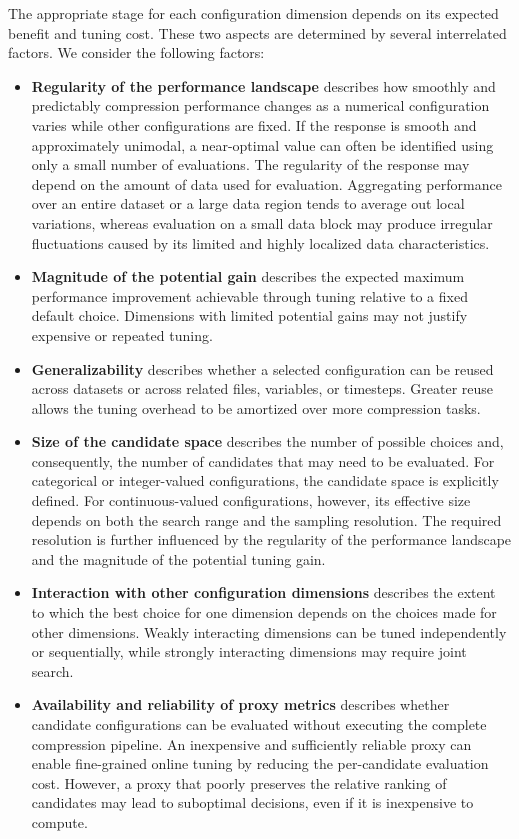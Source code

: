 The appropriate stage for each configuration dimension depends on its expected benefit and tuning cost. These two aspects are determined by several interrelated factors. We consider the following factors:

\begin{itemize}
\item \textbf{Regularity of the performance landscape} describes how smoothly and predictably compression performance changes as a numerical configuration varies while other configurations are fixed. If the response is smooth and approximately unimodal, a near-optimal value can often be identified using only a small number of evaluations. The regularity of the response may depend on the amount of data used for evaluation. Aggregating performance over an entire dataset or a large data region tends to average out local variations, whereas evaluation on a small data block may produce irregular fluctuations caused by its limited and highly localized data characteristics.

\item \textbf{Magnitude of the potential gain} describes the expected maximum performance improvement achievable through tuning relative to a fixed default choice. Dimensions with limited potential gains may not justify expensive or repeated tuning.

\item \textbf{Generalizability} describes whether a selected configuration can be reused across datasets or across related files, variables, or timesteps. Greater reuse allows the tuning overhead to be amortized over more compression tasks.

\item \textbf{Size of the candidate space} describes the number of possible choices and, consequently, the number of candidates that may need to be evaluated. For categorical or integer-valued configurations, the candidate space is explicitly defined. For continuous-valued configurations, however, its effective size depends on both the search range and the sampling resolution. The required resolution is further influenced by the regularity of the performance landscape and the magnitude of the potential tuning gain.

\item \textbf{Interaction with other configuration dimensions} describes the extent to which the best choice for one dimension depends on the choices made for other dimensions. Weakly interacting dimensions can be tuned independently or sequentially, while strongly interacting dimensions may require joint search.

\item \textbf{Availability and reliability of proxy metrics} describes whether candidate configurations can be evaluated without executing the complete compression pipeline. An inexpensive and sufficiently reliable proxy can enable fine-grained online tuning by reducing the per-candidate evaluation cost. However, a proxy that poorly preserves the relative ranking of candidates may lead to suboptimal decisions, even if it is inexpensive to compute.
\end{itemize}

